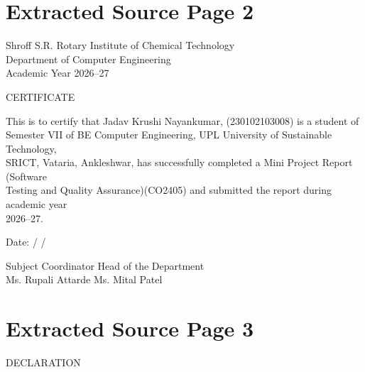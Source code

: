 \documentclass[12pt,a4paper]{report}
\begin{document}
\clearpage
\section*{Extracted Source Page 2}
Shroff S.R. Rotary Institute of Chemical Technology\\ 

\smallskip
Department of Computer Engineering\\ 

\smallskip
Academic Year 2026–27\\ 

\smallskip

\smallskip

\smallskip
CERTIFICATE\\ 

\smallskip

\smallskip

\smallskip
This is to certify that Jadav Krushi Nayankumar, (230102103008) is a student of\\ 
Semester VII of BE Computer Engineering, UPL University of Sustainable Technology,\\ 
SRICT, Vataria, Ankleshwar, has successfully completed a Mini Project Report (Software\\ 
Testing and Quality Assurance)(CO2405) and submitted the report during academic year\\ 
2026–27.\\ 

\smallskip

\smallskip

\smallskip

\smallskip
Date:           /       /\\ 

\smallskip

\smallskip

\smallskip

\smallskip
Subject Coordinator                           Head of the Department\\ 
Ms. Rupali Attarde                                Ms. Mital Patel\\ 

\clearpage
\section*{Extracted Source Page 3}
DECLARATION\\ 

\smallskip

\smallskip
\end{document}
